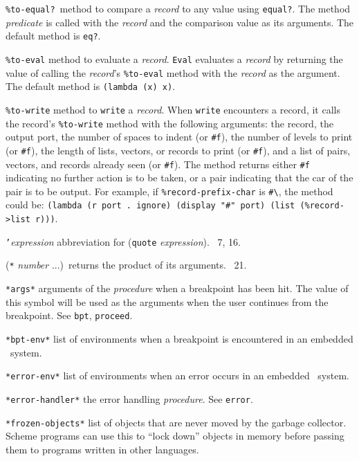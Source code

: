 \documentclass[10pt,twocolumn]{article}
\begin{document}
\texttt{\%to-equal?}\ method to compare a \emph{record} to any value
using \texttt{equal?}.  The method \emph{predicate} is called with the
\emph{record} and the comparison value as its arguments.  The default
method is \texttt{eq?}.

\texttt{\%to-eval} method to evaluate a \emph{record}.  \texttt{Eval}
evaluates a \emph{record} by returning the value of calling the
\emph{record}'s \texttt{\%to-eval} method with the \emph{record} as
the argument.  The default method is \texttt{(lambda (x) x)}.

\texttt{\%to-write} method to \texttt{write} a \emph{record}.  When
\texttt{write} encounters a record, it calls the record's
\texttt{\%to-write} method with the following arguments: the record,
the output port, the number of spaces to indent (or \texttt{\#f}), the
number of levels to print (or \texttt{\#f}), the length of lists,
vectors, or records to print (or \texttt{\#f}), and a list of pairs,
vectors, and records already seen (or \texttt{\#f}).  The method
returns either \texttt{\#f} indicating no further action is to be
taken, or a pair indicating that the car of the pair is to be output.
For example, if \texttt{\%record-prefix-char} is
\texttt{\#\textbackslash\texttildelow}, the method could be:
\texttt{(lambda (r port .\ ignore) (display "\#\texttildelow" port)
  (list (\%record->list r)))}.

\texttt{'}\emph{expression} abbreviation for (\texttt{quote}
\emph{expression}).  \RRRRRS~7, 16.

(\texttt{*} \emph{number} ...)\ returns the product of its arguments.
\RRRRRS~21.

\texttt{*args*} arguments of the \emph{procedure} when a breakpoint
has been hit.  The value of this symbol will be used as the arguments
when the user continues from the breakpoint.  See \texttt{bpt},
\texttt{proceed}.

\texttt{*bpt-env*} list of environments when a breakpoint is
encountered in an embedded \StoC\ system.

\texttt{*error-env*} list of environments when an error occurs in an
embedded \StoC\ system.

\texttt{*error-handler*} the error handling \emph{procedure}.  See
\texttt{error}.

\texttt{*frozen-objects*} list of objects that are never moved by the
garbage collector.  Scheme programs can use this to ``lock down''
objects in memory before passing them to programs written in other
languages.
\end{document}
